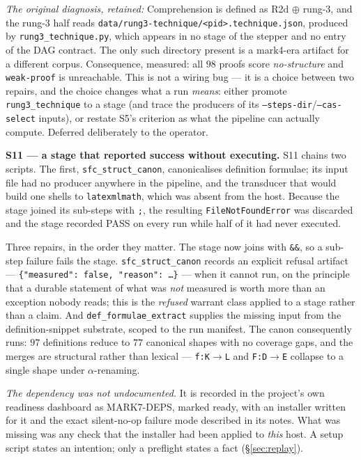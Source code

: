 \documentclass[11pt]{article}
\newcommand{\warrant}[1]{\textsl{#1}}
\newcommand{\hz}[1]{\textsf{#1}}
\begin{document}
\emph{The original diagnosis, retained:}
Comprehension is defined as R2d $\oplus$ rung-3, and the rung-3 half reads
\texttt{data/rung3-technique/<pid>.technique.json}, produced by
\texttt{rung3\_technique.py}, which appears in no stage of the stepper and no
entry of the DAG contract. The only such directory present is a mark4-era
artifact for a different corpus. Consequence, measured: all $98$ proofs score
\emph{no-structure} and \texttt{weak-proof} is unreachable. This is not a
wiring bug --- it is a choice between two repairs, and the choice changes what
a run \emph{means}: either promote \texttt{rung3\_technique} to a stage (and
trace the producers of its \texttt{--steps-dir}/\texttt{--cas-select} inputs),
or restate S5's criterion as what the pipeline can actually compute. Deferred
deliberately to the operator.

\textbf{\hz{S11} --- a stage that reported success without executing.} S11
chains two scripts. The first, \texttt{sfc\_struct\_canon}, canonicalises
definition formulae; its input file had no producer anywhere in the pipeline,
and the transducer that would build one shells to \texttt{latexmlmath}, which
was absent from the host. Because the stage joined its sub-steps with
\texttt{;}, the resulting \texttt{FileNotFoundError} was discarded and the stage
recorded PASS on every run while half of it had never executed.

Three repairs, in the order they matter. The stage now joins with
\texttt{\&\&}, so a sub-step failure fails the stage. \texttt{sfc\_struct\_canon}
records an explicit refusal artifact --- \texttt{\{"measured": false, "reason":
\dots\}} --- when it cannot run, on the principle that a durable statement of
what was \emph{not} measured is worth more than an exception nobody reads; this
is the \warrant{refused} warrant class applied to a stage rather than a claim.
And \texttt{def\_formulae\_extract} supplies the missing input from the
definition-snippet substrate, scoped to the run manifest. The canon consequently
runs: $97$ definitions reduce to $77$ canonical shapes with no coverage gaps,
and the merges are structural rather than lexical --- \texttt{f:K}$\to$\texttt{L} and \texttt{F:D}$\to$\texttt{E} collapse to a single shape under
$\alpha$-renaming.

\emph{The dependency was not undocumented.} It is recorded in the project's own
readiness dashboard as MARK7-DEPS, marked ready, with an installer written for
it and the exact silent-no-op failure mode described in its notes. What was
missing was any check that the installer had been applied to \emph{this} host.
A setup script states an intention; only a preflight states a fact
(\S\ref{sec:replay}).
\end{document}
